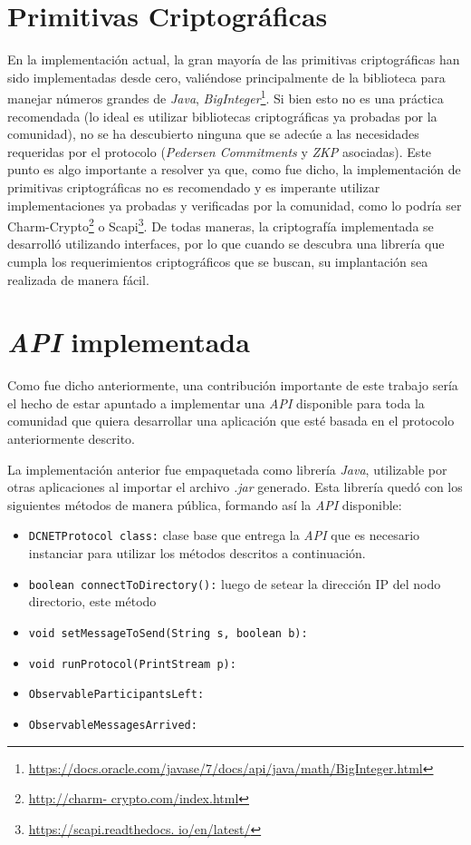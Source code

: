 \section{Primitivas Criptográficas}

En la implementación actual, la gran mayoría de las primitivas criptográficas 
han sido implementadas desde cero, valiéndose principalmente de la biblioteca 
para manejar números grandes de \emph{Java}, \emph{BigInteger}\footnote{\url{
https://docs.oracle.com/javase/7/docs/api/java/math/BigInteger.html}}. Si bien 
esto no es una práctica recomendada (lo ideal es utilizar bibliotecas 
criptográficas ya probadas por la comunidad), no se ha descubierto ninguna que 
se adecúe a las necesidades requeridas por el protocolo (\emph{Pedersen 
Commitments} y \emph{ZKP} asociadas). Este punto es algo importante a resolver 
ya que, como fue dicho, la implementación de primitivas criptográficas no es 
recomendado y es imperante utilizar implementaciones ya probadas y verificadas 
por la comunidad, como lo podría ser Charm-Crypto\footnote{\url{http://charm-
crypto.com/index.html}} o Scapi\footnote{\url{https://scapi.readthedocs.
io/en/latest/}}. De todas maneras, la criptografía implementada se desarrolló 
utilizando interfaces, por lo que cuando se descubra una librería que cumpla 
los requerimientos criptográficos que se buscan, su implantación sea realizada 
de manera fácil.

\section{\emph{API} implementada}

Como fue dicho anteriormente, una contribución importante de este trabajo 
sería el hecho de estar apuntado a implementar una \emph{API} disponible para 
toda la comunidad que quiera desarrollar una aplicación que esté basada en el 
protocolo anteriormente descrito. 

La implementación anterior fue empaquetada como librería \emph{Java}, 
utilizable por otras aplicaciones al importar el archivo \emph{.jar} generado. 
Esta librería quedó con los siguientes métodos de manera pública, formando así 
la \emph{API} disponible:

\begin{itemize}
    \item \texttt{DCNETProtocol class:} clase base que entrega la \emph{API} 
    que es necesario instanciar para utilizar los métodos descritos a 
    continuación. 
    \item \texttt{boolean connectToDirectory():} luego de setear la dirección 
    IP del nodo directorio, este método
    \item \texttt{void setMessageToSend(String s, boolean b):}
    \item \texttt{void runProtocol(PrintStream p):}
    \item \texttt{ObservableParticipantsLeft:}
    \item \texttt{ObservableMessagesArrived:}
\end{itemize}

